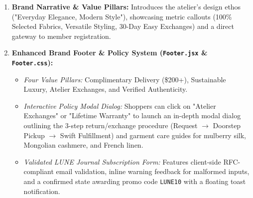 \documentclass[12pt,a4paper,oneside]{report}
\begin{document}
\begin{enumerate}[leftmargin=1.2cm]
    \item \textbf{Brand Narrative \& Value Pillars:}
    Introduces the atelier's design ethos ("Everyday Elegance, Modern Style"), showcasing metric callouts (100\% Selected Fabrics, Versatile Styling, 30-Day Easy Exchanges) and a direct gateway to member registration.
    \item \textbf{Enhanced Brand Footer \& Policy System (\texttt{Footer.jsx} \& \texttt{Footer.css}):}
    \begin{itemize}[nosep]
        \item \textit{Four Value Pillars:} Complimentary Delivery (\$200+), Sustainable Luxury, Atelier Exchanges, and Verified Authenticity.
        \item \textit{Interactive Policy Modal Dialog:} Shoppers can click on "Atelier Exchanges" or "Lifetime Warranty" to launch an in-depth modal dialog outlining the 3-step return/exchange procedure (Request $\rightarrow$ Doorstep Pickup $\rightarrow$ Swift Fulfillment) and garment care guides for mulberry silk, Mongolian cashmere, and French linen.
        \item \textit{Validated LUNE Journal Subscription Form:} Features client-side RFC-compliant email validation, inline warning feedback for malformed inputs, and a confirmed state awarding promo code \texttt{LUNE10} with a floating toast notification.
    \end{itemize}
\end{enumerate}
\end{document}
